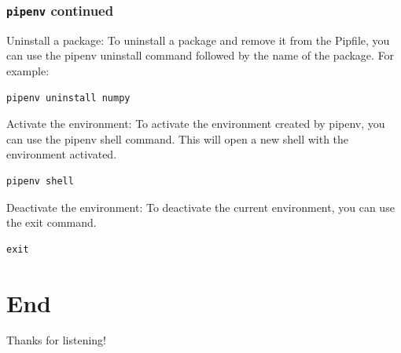 \documentclass{beamer}
\begin{document}
\begin{frame}[fragile]
  \frametitle{\texttt{pipenv} continued}

  Uninstall a package: To uninstall a package and remove it from the Pipfile, you can use the pipenv uninstall command followed by the name of the package. For example:

  \begin{lstlisting}
pipenv uninstall numpy
\end{lstlisting}

  Activate the environment: To activate the environment created by pipenv, you can use the pipenv shell command. This will open a new shell with the environment activated.

  \begin{lstlisting}
pipenv shell
\end{lstlisting}

  Deactivate the environment: To deactivate the current environment, you can use the exit command.

  \begin{lstlisting}
exit
\end{lstlisting}

\end{frame}

\section{End}
\begin{frame}
  \LARGE
  \centering
  Thanks for listening!
\end{frame}
\end{document}
